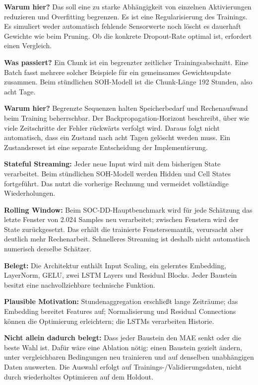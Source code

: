 \textbf{Warum hier?} Das soll eine zu starke Abhängigkeit von einzelnen Aktivierungen reduzieren und Overfitting begrenzen. Es ist eine Regularisierung des Trainings. Es simuliert weder automatisch fehlende Sensorwerte noch löscht es dauerhaft Gewichte wie beim Pruning. Ob die konkrete Dropout-Rate optimal ist, erfordert einen Vergleich.

\textbf{Was passiert?} Ein Chunk ist ein begrenzter zeitlicher Trainingsabschnitt. Eine Batch fasst mehrere solcher Beispiele für ein gemeinsames Gewichtsupdate zusammen. Beim stündlichen SOH-Modell ist die Chunk-Länge 192 Stunden, also acht Tage.

\textbf{Warum hier?} Begrenzte Sequenzen halten Speicherbedarf und Rechenaufwand beim Training beherrschbar. Der Backpropagation-Horizont beschreibt, über wie viele Zeitschritte der Fehler rückwärts verfolgt wird. Daraus folgt nicht automatisch, dass ein Zustand nach acht Tagen gelöscht werden muss. Ein Zustandsreset ist eine separate Entscheidung der Implementierung.

\textbf{Stateful Streaming:} Jeder neue Input wird mit dem bisherigen State verarbeitet. Beim stündlichen SOH-Modell werden Hidden und Cell States fortgeführt. Das nutzt die vorherige Rechnung und vermeidet vollständige Wiederholungen.

\textbf{Rolling Window:} Beim SOC-DD-Hauptbenchmark wird für jede Schätzung das letzte Fenster von 2.024 Samples neu verarbeitet; zwischen Fenstern wird der State zurückgesetzt. Das erhält die trainierte Fenstersemantik, verursacht aber deutlich mehr Rechenarbeit. Schnelleres Streaming ist deshalb nicht automatisch numerisch derselbe Schätzer.

\textbf{Belegt:} Die Architektur enthält Input Scaling, ein gelerntes Embedding, LayerNorm, GELU, zwei LSTM Layers und Residual Blocks. Jeder Baustein besitzt eine nachvollziehbare technische Funktion.

\textbf{Plausible Motivation:} Stundenaggregation erschließt lange Zeiträume; das Embedding bereitet Features auf; Normalisierung und Residual Connections können die Optimierung erleichtern; die LSTMs verarbeiten Historie.

\textbf{Nicht allein dadurch belegt:} Dass jeder Baustein den MAE senkt oder die beste Wahl ist. Dafür wäre eine Ablation nötig: einen Baustein gezielt ändern, unter vergleichbaren Bedingungen neu trainieren und auf denselben unabhängigen Daten auswerten. Die Auswahl erfolgt auf Trainings-/Validierungsdaten, nicht durch wiederholtes Optimieren auf dem Holdout.

